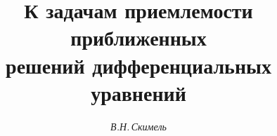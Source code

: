 

 




 


\newcommand{\A}{\cal A} 


\newcommand{\col}{\operatorname{col}} 


\newcommand{\const}{\operatorname{const}} 


\newcommand{\diag}{\operatorname{diag}} 


\newcommand{\vraisup}{\operatornamewithlimits{vrai~sup}} 


\newcommand{\tts}[1]{} 


 




  


\setcounter{page}{74} 












 


\author{\it В.Н.\,Скимель} 




\title{К задачам приемлемости приближенных\\ 


решений дифференциальных уравнений} 


 


\date{} 




\pagestyle{plain} %


